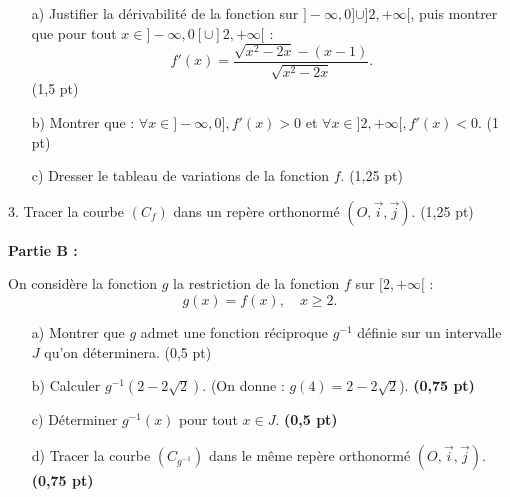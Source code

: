 \documentclass[a4paper,12pt]{article}
\begin{document}
\begin{enumerate}
    \item[a)] Justifier la dérivabilité de la fonction sur \( ]-\infty, 0] \cup ]2, +\infty[ \), puis montrer que pour tout \( x \in ]-\infty, 0[ \cup ]2, +\infty[ \) :
    \[
    f'(x) = \frac{\sqrt{x^2 - 2x} - (x - 1)}{\sqrt{x^2 - 2x}}.
    \]
    \hspace{1cm} (1,5 pt)
    
    \item[b)] Montrer que : \( \forall x \in ]-\infty, 0], f'(x) > 0 \) et \( \forall x \in ]2, +\infty[, f'(x) < 0 \). \hspace{1cm} (1 pt)
    
    \item[c)] Dresser le tableau de variations de la fonction \( f \). \hspace{1cm} (1,25 pt)
\end{enumerate}

3. Tracer la courbe \( (C_f) \) dans un repère orthonormé \( (O, \vec{i}, \vec{j}) \). \hspace{1cm} (1,25 pt)

\textbf{Partie B :}

On considère la fonction \( g \) la restriction de la fonction \( f \) sur \( [2, +\infty[ \) :
\[
g(x) = f(x), \quad x \geq 2.
\]

\begin{enumerate}
    \item[a)] Montrer que \( g \) admet une fonction réciproque \( g^{-1} \) définie sur un intervalle \( J \) qu'on déterminera. \hspace{1cm} (0,5 pt)
    
    \item[b)] Calculer \( g^{-1}(2 - 2\sqrt{2}) \). (On donne : \( g(4) = 2 - 2\sqrt{2} \)). \hspace{1cm} \textbf{(0,75 pt)}
    
    \item[c)] Déterminer \( g^{-1}(x) \) pour tout \( x \in J \). \hspace{3cm} \textbf{(0,5 pt)}
    
    \item[d)] Tracer la courbe \( (C_{g^{-1}}) \) dans le même repère orthonormé \( (O, \vec{i}, \vec{j}) \). \hspace{2cm} \textbf{(0,75 pt)}
\end{enumerate}
\end{document}
